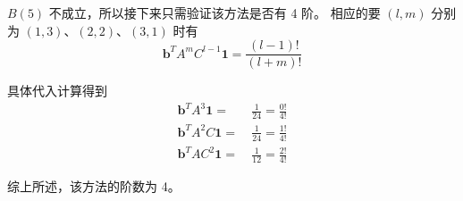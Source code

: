 \documentclass[a4paper]{article}
\begin{document}
\par $B(5)$ 不成立，所以接下来只需验证该方法是否有 4 阶。
相应的要 $(l, m)$ 分别为 $(1,3)$、$(2,2)$、$(3,1)$ 时有
\begin{equation}
    \mathbf{b}^TA^mC^{l-1}\mathbf{1} = \frac{(l-1)!}{(l+m)!}
\end{equation}
\par 具体代入计算得到
\begin{equation}
    \begin{aligned}
        \mathbf{b}^TA^3\mathbf{1} =&\ \frac{1}{24} = \frac{0!}{4!}\\
        \mathbf{b}^TA^2C\mathbf{1} =&\ \frac{1}{24} = \frac{1!}{4!}\\
        \mathbf{b}^TAC^2\mathbf{1} =&\ \frac{1}{12} = \frac{2!}{4!}
    \end{aligned}
\end{equation}
\par 综上所述，该方法的阶数为 4。


\printbibliography
\end{document}

